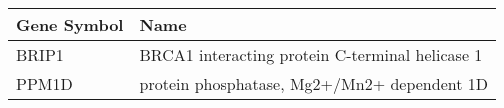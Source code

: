 \begin{tabular}{ll}
\toprule
Gene Symbol &                                            Name \\
\midrule
      BRIP1 & BRCA1 interacting protein C-terminal helicase 1 \\
      PPM1D &     protein phosphatase, Mg2+/Mn2+ dependent 1D \\
\bottomrule
\end{tabular}

